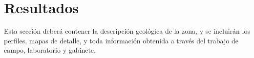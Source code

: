 \setcounter{figure}{0} %
\renewcommand{\thefigure}{\thesection.\arabic{figure}}
\section{\Large Resultados}
Esta sección deberá contener la descripción geológica de la zona, y se incluirán los perfiles, mapas de detalle, y toda información obtenida a través del trabajo de campo, laboratorio y gabinete.